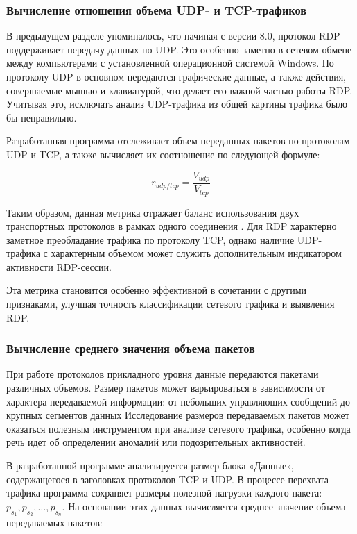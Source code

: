 \documentclass[bachelor, och, coursework]{SCWorks}
\begin{document}
\subsubsection{Вычисление отношения объема UDP- и TCP-трафиков}

В предыдущем разделе упоминалось, что начиная с версии 8.0, протокол RDP поддерживает передачу данных по UDP. Это особенно заметно в 
сетевом обмене между компьютерами с установленной операционной системой Windows. По протоколу UDP в основном передаются графические данные, 
а также действия, совершаемые мышью и клавиатурой, что делает его важной частью работы RDP. Учитывая это, исключать анализ UDP-трафика из 
общей картины трафика было бы неправильно.

Разработанная программа отслеживает объем переданных пакетов по протоколам UDP и TCP, а также вычисляет их соотношение по следующей формуле:

\begin{equation}
  r_{udp/tcp} = \frac{V_{udp}}{V_{tcp}}
\end{equation}

Таким образом, данная метрика отражает баланс использования двух транспортных протоколов в рамках одного соединения \cite{lib1}. Для RDP характерно 
заметное преобладание трафика по протоколу TCP, однако наличие UDP-трафика с характерным объемом может служить дополнительным индикатором 
активности RDP-сессии.

Эта метрика становится особенно эффективной в сочетании с другими признаками, улучшая точность классификации сетевого трафика и выявления RDP.

\subsubsection{Вычисление среднего значения объема пакетов}

При работе протоколов прикладного уровня данные передаются пакетами различных объемов. 
Размер пакетов может варьироваться в зависимости от характера передаваемой информации: от небольших управляющих сообщений до крупных сегментов данных
Исследование размеров передаваемых пакетов может оказаться полезным инструментом при анализе сетевого 
трафика, особенно когда речь идет об определении аномалий или подозрительных активностей.


В разработанной программе анализируется размер блока «Данные», содержащегося в заголовках протоколов TCP и UDP. В процессе перехвата 
трафика программа сохраняет размеры полезной нагрузки каждого пакета: \\ $p_{s_1}, p_{s_2}, \dots, p_{s_n}$. На основании этих данных 
вычисляется среднее значение объема передаваемых пакетов:
\end{document}
